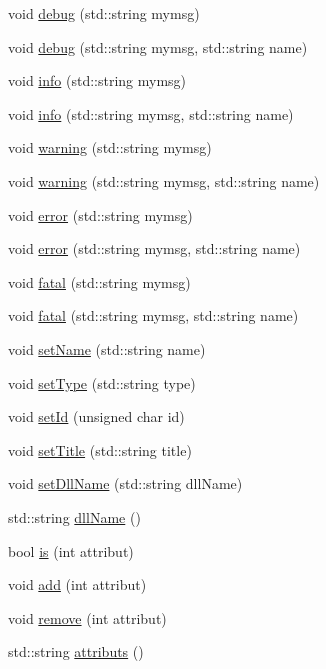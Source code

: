 \begin{DoxyCompactItemize}
\item 
void \hyperlink{classObject_aac010553f022165573714b7014a15f0d}{debug} (std::string mymsg)
\item 
void \hyperlink{classObject_a6c9a0397ca804e04d675ed05683f5420}{debug} (std::string mymsg, std::string name)
\item 
void \hyperlink{classObject_a644fd329ea4cb85f54fa6846484b84a8}{info} (std::string mymsg)
\item 
void \hyperlink{classObject_a1ca123253dfd30fc28b156f521dcbdae}{info} (std::string mymsg, std::string name)
\item 
void \hyperlink{classObject_a65cd4fda577711660821fd2cd5a3b4c9}{warning} (std::string mymsg)
\item 
void \hyperlink{classObject_a11f101db4dd73d9391b0231818881d86}{warning} (std::string mymsg, std::string name)
\item 
void \hyperlink{classObject_a204a95f57818c0f811933917a30eff45}{error} (std::string mymsg)
\item 
void \hyperlink{classObject_ad7f6c457733082efa2f9ff5f5c8e119a}{error} (std::string mymsg, std::string name)
\item 
void \hyperlink{classObject_aad5a16aac7516ce65bd5ec02ab07fc80}{fatal} (std::string mymsg)
\item 
void \hyperlink{classObject_ae62acd3d09f716220f75f252dc38bc9a}{fatal} (std::string mymsg, std::string name)
\item 
void \hyperlink{classObject_ae30fea75683c2d149b6b6d17c09ecd0c}{setName} (std::string name)
\item 
void \hyperlink{classObject_aae534cc9d982bcb9b99fd505f2e103a5}{setType} (std::string type)
\item 
void \hyperlink{classObject_a398fe08cba594a0ce6891d59fe4f159f}{setId} (unsigned char id)
\item 
void \hyperlink{classObject_a89557dbbad5bcaa02652f5d7fa35d20f}{setTitle} (std::string title)
\item 
void \hyperlink{classObject_a870c5af919958c2136623b2d7816d123}{setDllName} (std::string dllName)
\item 
std::string \hyperlink{classObject_a2e3947f2870094c332d7454117f3ec63}{dllName} ()
\item 
bool \hyperlink{classAttrib_a704f26af560909ad22065083bb7d4c34}{is} (int attribut)
\item 
void \hyperlink{classAttrib_a235f773af19c900264a190b00a3b4ad7}{add} (int attribut)
\item 
void \hyperlink{classAttrib_a7d4ef7e32d93cb287792b87b857e79f3}{remove} (int attribut)
\item 
std::string \hyperlink{classAttrib_aee7bbf16b144887f196e1341b24f8a26}{attributs} ()
\end{DoxyCompactItemize}
